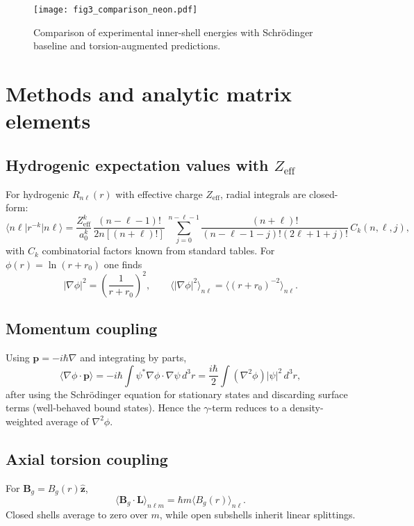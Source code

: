 \documentclass[12pt]{article}
\begin{document}
\begin{figure}[h]
\centering
\texttt{[image: fig3\_comparison\_neon.pdf]}
\caption{Comparison of experimental inner-shell energies with Schrödinger baseline and torsion-augmented predictions.}
\end{figure}

\clearpage
\appendix
\section{Methods and analytic matrix elements}
\label{sec:methods}
\subsection{Hydrogenic expectation values with $Z_{\mathrm{eff}}$}
For hydrogenic $R_{n\ell}(r)$ with effective charge $Z_{\mathrm{eff}}$, radial integrals are closed-form:
\begin{equation}
\big\langle n\ell \big| r^{-k} \big| n\ell \big\rangle
= \frac{Z_{\mathrm{eff}}^k}{a_0^k}\,\frac{(n-\ell-1)!}{2n[(n+\ell)!]}\, \sum_{j=0}^{n-\ell-1} \frac{(n+\ell)!}{(n-\ell-1-j)!(2\ell+1+j)!}\, C_{k}(n,\ell,j),
\end{equation}
with $C_k$ combinatorial factors known from standard tables.\cite{BetheSalpeter} For $\phi(r)=\ln(r+r_0)$ one finds
\begin{equation}
|\nabla \phi|^2 = \left(\frac{1}{r+r_0}\right)^2, \qquad
\big\langle |\nabla \phi|^2 \big\rangle_{n\ell} = \big\langle (r+r_0)^{-2} \big\rangle_{n\ell}.
\end{equation}

\subsection{Momentum coupling}
Using $\bm{p}=-i\hbar \nabla$ and integrating by parts,
\begin{equation}
\big\langle \nabla \phi \cdot \bm{p} \big\rangle
= -i\hbar \int \psi^\ast \nabla \phi \cdot \nabla \psi \, d^3r
= \frac{i\hbar}{2} \int (\nabla^2 \phi) |\psi|^2 \, d^3r,
\end{equation}
after using the Schrödinger equation for stationary states and discarding surface terms (well-behaved bound states). Hence the $\gamma$-term reduces to a density-weighted average of $\nabla^2 \phi$.

\subsection{Axial torsion coupling}
For $\bm{B}_g=B_g(r)\hat{\bm{z}}$,
\begin{equation}
\big\langle \bm{B}_g\cdot \bm{L} \big\rangle_{n\ell m} = \hbar m \big\langle B_g(r) \big\rangle_{n\ell}.
\end{equation}
Closed shells average to zero over $m$, while open subshells inherit linear splittings.
\end{document}
